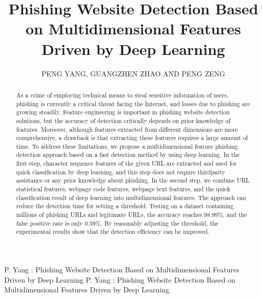 \documentclass{ieeeaccess}
\begin{document}

\title{Phishing Website Detection Based on
Multidimensional Features Driven
by Deep Learning}
\author{\uppercase{PENG YANG,}
\uppercase{GUANGZHEN ZHAO AND PENG ZENG}}
\address[1]{School of Computer Science and Engineering, Southeast University, Nanjing 211189, China}
\address[2]{Key Laboratory of Computer Network and Information Integration Ministry of Education, Ministry of Education, Nanjing 211189, China}


\markboth
{P. Yang \headeretal: Phishing Website Detection Based on
Multidimensional Features Driven
by Deep Learning}
{P. Yang \headeretal: Phishing Website Detection Based on
Multidimensional Features Driven
by Deep Learning}


\begin{abstract}
As a crime of employing technical means to steal sensitive information of users, phishing is currently a critical threat facing the Internet, and losses due to phishing are growing steadily. Feature
engineering is important in phishing website detection solutions, but the accuracy of detection critically depends on prior knowledge of features. Moreover, although features extracted from different dimensions are more comprehensive, a drawback is that extracting these features requires a large amount of time. To address these limitations, we propose a multidimensional feature phishing detection approach based on a fast detection method by using deep learning. In the first step, character sequence features of the given URL are extracted and used for quick classification by deep learning, and this step does not require thirdparty assistance or any prior knowledge about phishing. In the second step, we combine URL statistical features, webpage code features, webpage text features, and the quick classification result of deep learning into multidimensional features. The approach can reduce the detection time for setting a threshold. Testing on a dataset containing millions of phishing URLs and legitimate URLs, the accuracy reaches 98.99\%, and the false positive rate is only 0.59\%. By reasonably adjusting the threshold, the experimental results show that the detection efficiency can be improved.
\end{abstract}
\end{document}
